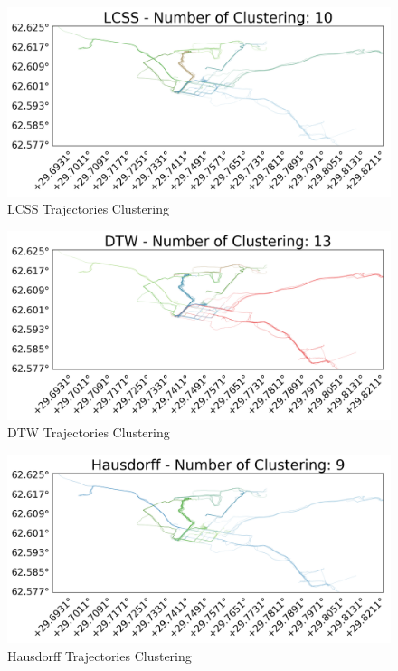 \documentclass[a4paper, 12pt]{article}
\begin{document}
\begin{figure}[ht]
    \centering
    \includegraphics[width=1\textwidth]{lcss_trajectory_clustering.png}
    \caption{LCSS Trajectories Clustering}
    \label{fig19}
\end{figure}

\pagebreak

\begin{figure}[ht]
    \centering
    \includegraphics[width=1\textwidth]{dtw_trajectory_clustering.png}
    \caption{DTW Trajectories Clustering}
    \label{fig20}
\end{figure}

\begin{figure}[ht]
    \centering
    \includegraphics[width=1\textwidth]{hausdorff_trajectory_clustering.png}
    \caption{Hausdorff Trajectories Clustering}
    \label{fig21}
\end{figure}
\end{document}
